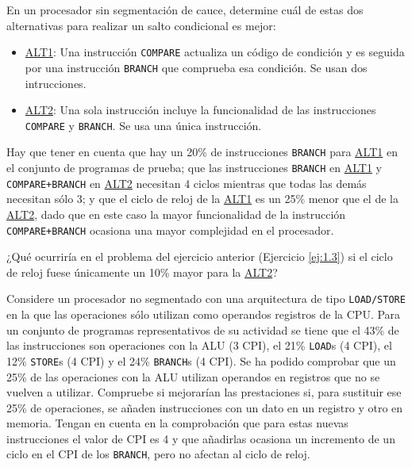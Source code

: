 \begin{ejercicio} \label{ej:1.3}
    En un procesador sin segmentación de cauce, determine cuál de estas dos alternativas para
    realizar un salto condicional es mejor:
    \begin{itemize}
        \item \ul{ALT1}: Una instrucción \verb|COMPARE| actualiza un código de condición y es seguida por una instrucción \verb|BRANCH| que comprueba esa condición. Se usan dos intrucciones.
        \item \ul{ALT2}: Una sola instrucción incluye la funcionalidad de las instrucciones \verb|COMPARE| y \verb|BRANCH|. Se usa una única instrucción.
    \end{itemize}

    Hay que tener en cuenta que hay un 20\% de instrucciones \verb|BRANCH| para \ul{ALT1}
    en el conjunto de programas de prueba; que las instrucciones \verb|BRANCH| en \ul{ALT1} y
    \verb|COMPARE+BRANCH| en \ul{ALT2} necesitan 4 ciclos mientras que todas las demás necesitan sólo 3;
    y que el ciclo de reloj de la \ul{ALT1} es un 25\% menor que el de la \ul{ALT2}, dado que en este caso
    la mayor funcionalidad de la instrucción \verb|COMPARE+BRANCH| ocasiona una mayor complejidad en el procesador.
\end{ejercicio}

\begin{ejercicio}
    ¿Qué ocurriría en el problema del ejercicio anterior (Ejercicio \ref{ej:1.3}) si el ciclo de reloj fuese únicamente un 10\% mayor para
    la \ul{ALT2}?
\end{ejercicio}

\begin{ejercicio} \label{ej:1.5}
    Considere un procesador no segmentado con una arquitectura de tipo \verb|LOAD/STORE| en la que las
    operaciones sólo utilizan como operandos registros de la CPU. Para un conjunto de programas
    representativos de su actividad se tiene que el 43\% de las instrucciones son operaciones con la ALU (3 CPI),
    el 21\% \verb|LOAD|s (4 CPI), el 12\% \verb|STORE|s (4 CPI) y el 24\% \verb|BRANCH|s (4 CPI).
    Se ha podido comprobar que un 25\% de las operaciones con la ALU utilizan operandos en registros que no se
    vuelven a utilizar. Compruebe si mejorarían las prestaciones si, para sustituir ese 25\% de operaciones, se
    añaden instrucciones con un dato en un registro y otro en memoria. Tengan en cuenta en la comprobación que para estas nuevas instrucciones el valor de CPI es 4 y que añadirlas ocasiona un incremento de un ciclo
    en el CPI de los \verb|BRANCH|, pero no afectan al ciclo de reloj.
\end{ejercicio}

